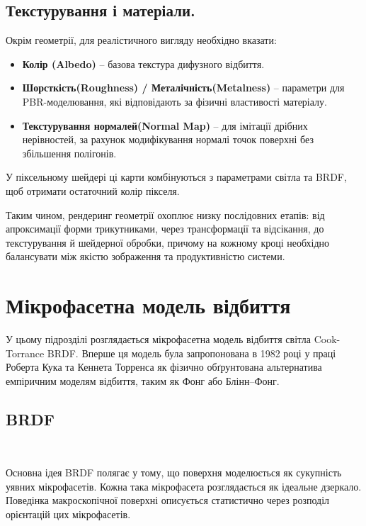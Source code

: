 \subsection*{Текстурування і матеріали.}
Окрім геометрії, для реалістичного виг\-ля\-ду необхідно вказати:
\begin{itemize}
    \item \textbf{Колір (Albedo)} -- базова текстура дифузного відбиття.
    \item \textbf{Шорсткість(Roughness) / Металічність(Metalness)} -- парамет\-ри для PBR-моделювання, які відповідають за фізичні властивості матеріалу.
    \item \textbf{Текстурування нормалей(Normal Map)} -- для імітації дрібних нерівностей, за рахунок модифікування нормалі точок поверхні без збільшення полігонів.
\end{itemize}

У піксельному шейдері ці карти комбінуються з параметрами світла та BRDF, щоб отримати остаточний колір пікселя.

\medskip
Таким чином, рендеринг геометрії охоплює низку послідовних етапів: від апроксимації форми трикутниками, через трансформації та відсікання, до текстурування й 
шейдерної обробки, причому на кожному кроці необхідно балансувати між якістю зображення та продуктивністю системи.

\section{Мікрофасетна модель відбиття}
\setcounter{equation}{0}
\setcounter{theorem}{0}

У цьому підрозділі розглядається мікрофасетна модель відбиття світла \linebreak Cook-Tor\-ran\-ce BRDF. Вперше ця модель була запропонована 
в 1982 році у праці Роберта Кука та Кеннета Торренса \cite{cook1982reflectance} як фізично обґрунтована альтернатива емпіричним моделям відбиття, таким як Фонг або Блінн–Фонг.

\subsection{BRDF}\\
\par
Основна ідея BRDF полягає у тому, що поверхня моделюється як сукупність уявних мікрофасетів. Кожна така мікрофасета роз\-гля\-да\-єть\-ся як ідеальне дзеркало. Поведінка макроскопічної поверхні описується статистично 
через розподіл орієнтацій цих мікрофасетів.

